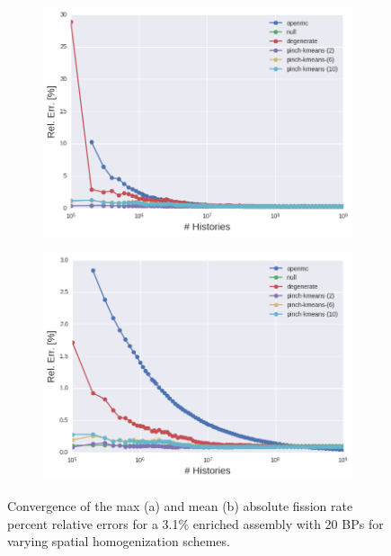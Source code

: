 \clearpage

\begin{figure}[h!]
\centering
\begin{subfigure}{\textwidth}
  \centering
  \includegraphics[width=0.9\linewidth]{figures/results/assm-31-20BPs/no-transform/evo-fission-max}
  \caption{}
  \label{fig:chap11-assm-3.1-20BPs-fission-converge-max}
\end{subfigure}
\begin{subfigure}{\textwidth}
  \centering
  \includegraphics[width=0.9\linewidth]{figures/results/assm-31-20BPs/no-transform/evo-fission-mean}
  \caption{}
  \label{fig:chap11-assm-3.1-20BPs-fission-converge-mean}
\end{subfigure}
\vspace{2mm}
\caption[Fission rate covergence for a 3.1\% enriched assembly with 20 \acp{BP}]{Convergence of the max (a) and mean (b) absolute fission rate percent relative errors for a 3.1\% enriched assembly with 20 \acp{BP} for varying spatial homogenization schemes.}
\label{fig:chap11-assm-3.1-20BPs-fission-converge}
\end{figure}

